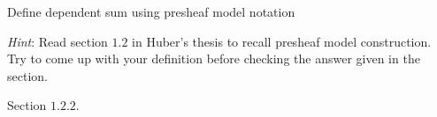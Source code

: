 \begin{exercise}
  Define dependent sum using presheaf model notation

  \emph{Hint}: Read section $1.2$ in Huber's thesis to recall presheaf model
  construction. Try to come up with your definition before checking the answer
  given in the section.
\end{exercise}
\begin{answer}
  Section $1.2.2$.
\end{answer}



